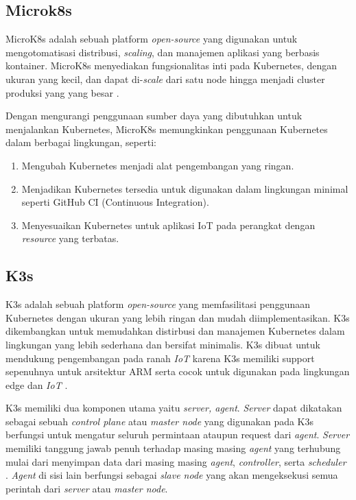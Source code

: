 \subsection{Microk8s}
MicroK8s adalah sebuah platform \textit{open-source} yang digunakan untuk mengotomatisasi distribusi, \textit{scaling}, dan manajemen aplikasi yang berbasis kontainer. MicroK8s menyediakan fungsionalitas inti pada Kubernetes, dengan ukuran yang kecil, dan dapat di-\textit{scale} dari satu node hingga menjadi cluster produksi yang yang besar \parencite{microk8s}.

Dengan mengurangi penggunaan sumber daya yang dibutuhkan untuk menjalankan Kubernetes, MicroK8s memungkinkan penggunaan Kubernetes dalam berbagai lingkungan, seperti:

\begin{enumerate}
  \item Mengubah Kubernetes menjadi alat pengembangan yang ringan.
  \item Menjadikan Kubernetes tersedia untuk digunakan dalam lingkungan minimal seperti GitHub CI (Continuous Integration).
  \item Menyesuaikan Kubernetes untuk aplikasi IoT pada perangkat dengan \textit{resource} yang terbatas.
\end{enumerate}


\subsection{K3s}
K3s adalah sebuah platform \textit{open-source} yang memfasilitasi penggunaan Kubernetes dengan ukuran yang lebih ringan dan mudah diimplementasikan. K3s dikembangkan untuk memudahkan distirbusi dan manajemen Kubernetes dalam lingkungan yang lebih sederhana dan bersifat minimalis. K3s dibuat untuk mendukung pengembangan pada ranah \textit{IoT} karena K3s memiliki support sepenuhnya untuk arsitektur ARM serta cocok untuk digunakan pada lingkungan edge dan \textit{IoT} \parencite{k3s}.

K3s memiliki dua komponen utama yaitu \textit{server, agent}. \textit{Server} dapat dikatakan sebagai sebuah \textit{control plane} atau \textit{master node} yang digunakan pada K3s berfungsi untuk mengatur seluruh permintaan ataupun request dari \textit{agent}. \textit{Server} memiliki tanggung jawab penuh terhadap masing masing \textit{agent} yang terhubung mulai dari menyimpan data dari masing masing \textit{agent}, \textit{controller}, serta \textit{scheduler} \parencite{k3s}. \textit{Agent} di sisi lain berfungsi sebagai \textit{slave node} yang akan mengeksekusi semua perintah dari \textit{server} atau \textit{master node}.

